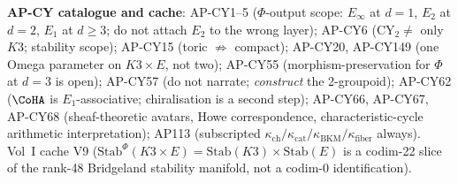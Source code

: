 \documentclass[11pt]{amsart}
\theoremstyle{definition}
\providecommand{\kch}{\kappa_{\mathrm{ch}}}
\providecommand{\kcat}{\kappa_{\mathrm{cat}}}
\providecommand{\kBKM}{\kappa_{\mathrm{BKM}}}
\providecommand{\kfib}{\kappa_{\mathrm{fiber}}}
\providecommand{\CY}{\mathrm{CY}}
\providecommand{\Stab}{\mathrm{Stab}}
\providecommand{\Eone}{E_1}
\providecommand{\Etwo}{E_2}
\begin{document}
\noindent\textbf{AP-CY catalogue and cache}:
AP-CY1--5 ($\Phi$-output scope: $E_\infty$ at $d = 1$, $\Etwo$ at
$d = 2$, $\Eone$ at $d \geq 3$; do not attach $\Etwo$ to the
wrong layer);
AP-CY6 ($\CY_2 \neq$ only $K3$; stability scope);
AP-CY15 (toric $\not\Rightarrow$ compact);
AP-CY20, AP-CY149 (one Omega parameter on $K3 \times E$, not two);
AP-CY55 (morphism-preservation for $\Phi$ at $d = 3$ is open);
AP-CY57 (do not narrate; \emph{construct} the 2-groupoid);
AP-CY62 ($\CoHA$ is $\Eone$-associative; chiralisation is a second
step);
AP-CY66, AP-CY67, AP-CY68 (sheaf-theoretic avatars, Howe
correspondence, characteristic-cycle arithmetic interpretation);
AP113 (subscripted $\kch / \kcat / \kBKM / \kfib$ always).
Vol~I cache V9 ($\Stab^\Phi(K3 \times E) = \Stab(K3) \times \Stab(E)$
is a codim-22 slice of the rank-48 Bridgeland stability manifold, not
a codim-0 identification).
\end{document}
